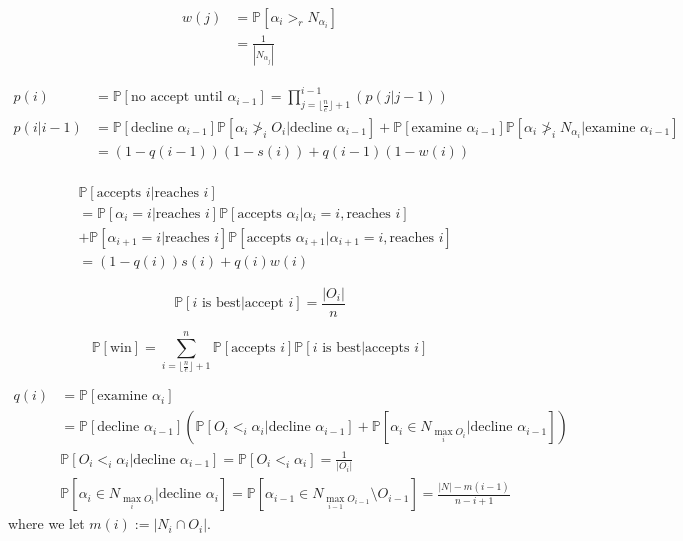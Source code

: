 \documentclass{article}
\newcommand{\prob}{\mathbb{P}}
\newcommand{\gt}{>}
\begin{document}
\begin{align*}
w(j) &= \prob[\alpha_i \gt_r N_{\alpha_i}]\\
&= \frac{1}{|N_{\alpha_j}|}
\end{align*}


\begin{align*}
p(i) &= \prob[\text{no accept until }\alpha_{i-1}]=\prod_{j=\lfloor\frac{n}{e}\rfloor + 1}^{i-1} \left( p(j|j-1) \right)\\
p(i|i-1) &= \prob[\text{decline }\alpha_{i-1}]\prob[\alpha_i \not >_i O_i | \text{decline }\alpha_{i-1}] + \prob[\text{examine }\alpha_{i-1}]\prob[\alpha_{i} \not >_i N_{\alpha_i} | \text{examine }\alpha_{i-1}]\\
&= \left( 1-q(i-1) \right)(1-s(i)) + q(i-1)(1-w(i))\\
\end{align*}





\begin{align*}
	&\prob[\text{accepts } i | \text{reaches }i] \\&= 
	\prob[\alpha_i = i | \text{reaches }i] 
	\prob[\text{accepts }\alpha_i | \alpha_i = i, \text{reaches }i]
	\\&+
	\prob[\alpha_{i+1} = i | \text{reaches }i]
	\prob[\text{accepts }\alpha_{i+1} | \alpha_{i+1} = i, \text{reaches }i]\\
	&= (1-q(i))s(i) + q(i) w(i)
\end{align*}

\begin{equation*}
\prob[i \text{ is best}|\text{accept }i] = \frac{|O_i|}{n}
\end{equation*}

\begin{equation*}
	\prob[\text{win}] = \sum_{i=\lfloor\frac{n}{e}\rfloor+1}^n
	\prob[\text{accepts } i ]\prob[i\text{ is best} | \text{accepts } i ]
\end{equation*}



\begin{align*}
q(i) &= \prob[\text{examine }\alpha_i]\\
&= \prob[\text{decline }\alpha_{i-1}]\left(\prob[O_i <_i \alpha_i |\text{decline }\alpha_{i-1}]+\prob[\alpha_i \in N_{\max_i O_i}|\text{decline }\alpha_{i-1}]\right)\\
&\prob[O_i <_i \alpha_i |\text{decline }\alpha_{i-1}] = \prob[O_i <_i \alpha_i] = \frac{1}{|O_i|}\\
&\prob[\alpha_i \in N_{\max_i O_i}|\text{decline }\alpha_{i}] = \prob[\alpha_{i-1} \in N_{\max_{i-1} O_{i-1}}\setminus O_{i-1}] = \frac{|N|-m(i-1)}{n-i+1}
\end{align*}
where we let $m(i):=|N_i\cap O_i|$.
\end{document}
